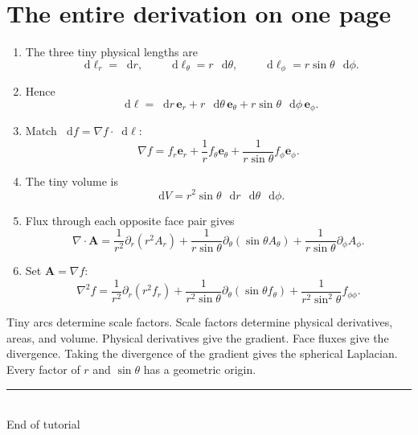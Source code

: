 \documentclass[11pt,a4paper]{article}
\newcommand{\er}{\bm e_r}
\newcommand{\etheta}{\bm e_\theta}
\newcommand{\ephi}{\bm e_\phi}
\newcommand{\dd}{\mathop{}\!\mathrm d}
\begin{document}
\clearpage

\section{The entire derivation on one page}

\begin{enumerate}
  \item The three tiny physical lengths are
  \[
    \dd\ell_r=\dd r,\qquad
    \dd\ell_\theta=r\,\dd\theta,\qquad
    \dd\ell_\phi=r\sin\theta\,\dd\phi.
  \]

  \item Hence
  \[
    \dd\bm\ell
    =\dd r\,\er+r\,\dd\theta\,\etheta
    +r\sin\theta\,\dd\phi\,\ephi.
  \]

  \item Match \(\dd f=\nabla f\cdot\dd\bm\ell\):
  \[
    \nabla f
    =f_r\er+\frac1r f_\theta\etheta
    +\frac{1}{r\sin\theta}f_\phi\ephi.
  \]

  \item The tiny volume is
  \[
    \dd V=r^2\sin\theta\,
    \dd r\,\dd\theta\,\dd\phi.
  \]

  \item Flux through each opposite face pair gives
  \[
    \nabla\cdot\bm A
    =\frac1{r^2}\partial_r(r^2A_r)
    +\frac1{r\sin\theta}\partial_\theta(\sin\theta A_\theta)
    +\frac1{r\sin\theta}\partial_\phi A_\phi.
  \]

  \item Set \(\bm A=\nabla f\):
  \[
  \boxed{
  \nabla^2 f
  =\frac{1}{r^2}\partial_r(r^2f_r)
  +\frac{1}{r^2\sin\theta}\partial_\theta(\sin\theta f_\theta)
  +\frac{1}{r^2\sin^2\theta}f_{\phi\phi}.}
  \]
\end{enumerate}

\begin{result}
Tiny arcs determine scale factors. Scale factors determine physical derivatives, areas, and volume. Physical derivatives give the gradient. Face fluxes give the divergence. Taking the divergence of the gradient gives the spherical Laplacian. Every factor of \(r\) and \(\sin\theta\) has a geometric origin.
\end{result}

\vfill
\begin{center}
{\color{blue}\rule{0.55\textwidth}{0.8pt}}\\[2mm]
{\small\color{ink!75}End of tutorial}
\end{center}
\end{document}
